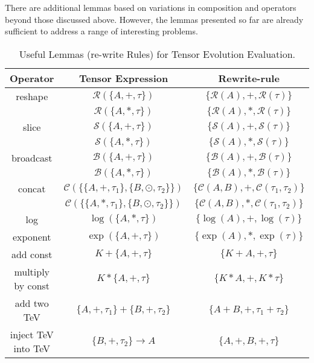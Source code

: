 \documentclass{article}
\begin{document}
    There are additional lemmas based on variations in composition and operators beyond those
     discussed above. However, the lemmas presented so far are already sufficient to address
      a range of interesting problems.
    \begin{table}[h!]
    \centering
    \begin{tabular}{|c|c|c|}
    \hline
    \textbf{Operator} & \textbf{Tensor Expression} & \textbf{Rewrite-rule} \\ \hline
    reshape & $\mathcal{R}(\{A, +, \tau\})$ & $\{\mathcal{R}(A), +, \mathcal{R}(\tau)\}$ \\ 
            & $\mathcal{R}(\{A, \ast, \tau\})$ & $\{\mathcal{R}(A), \ast, \mathcal{R}(\tau)\}$ \\ \hline
    slice & $\mathcal{S}(\{A, +, \tau\})$ & $\{\mathcal{S}(A), +, \mathcal{S}(\tau)\}$ \\ 
          & $\mathcal{S}(\{A, \ast, \tau\})$ & $\{\mathcal{S}(A), \ast, \mathcal{S}(\tau)\}$ \\ \hline
    broadcast & $\mathcal{B}(\{A, +, \tau\})$ & $\{\mathcal{B}(A), +, \mathcal{B}(\tau)\}$ \\ 
              & $\mathcal{B}(\{A, \ast, \tau\})$ & $\{\mathcal{B}(A), \ast, \mathcal{B}(\tau)\}$ \\ \hline
    concat & $\mathcal{C}(\{\{A, +, \tau_1\}, \{B, \odot, \tau_2\}\})$ & $\{\mathcal{C}(A, B), +, \mathcal{C}(\tau_1, \tau_2)\}$ \\ 
           & $\mathcal{C}(\{\{A, \ast, \tau_1\}, \{B, \odot, \tau_2\}\})$ & $\{\mathcal{C}(A, B), \ast, \mathcal{C}(\tau_1, \tau_2)\}$ \\ \hline
    log & $\log(\{A, \ast, \tau\})$ & $\{\log(A), +, \log(\tau)\}$ \\ \hline
    exponent & $\exp(\{A, +, \tau\})$ & $\{\exp(A), \ast, \exp(\tau)\}$ \\ \hline
    add const & $K + \{A, +, \tau\}$ & $\{K + A, +, \tau\}$ \\ \hline
    multiply by const & $K \ast \{A, +, \tau\}$ & $\{K \ast A, +, K \ast \tau\}$ \\ \hline
    add two TeV & $\{A, +, \tau_1\} + \{B, +, \tau_2\}$ & $\{A + B, +, \tau_1 + \tau_2\}$ \\ \hline
    inject TeV into TeV & $\{B, +, \tau_2\} \to A$ & $\{A, +, B, +, \tau\}$ \\ \hline
    \end{tabular}
    \caption{Useful Lemmas (re-write Rules) for Tensor Evolution Evaluation.}
    \label{table:tev}
    \end{table}
    
\end{document}
